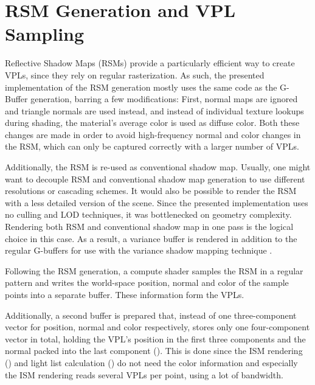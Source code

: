\section{RSM Generation and VPL Sampling}
\label{sec:impl:rsmAndVplSampling}

Reflective Shadow Maps (RSMs) provide a particularly efficient way to create VPLs, since they rely on regular rasterization. As such, the presented implementation of the RSM generation mostly uses the same code as the G-Buffer generation, barring a few modifications: First, normal maps are ignored and triangle normals are used instead, and instead of individual texture lookups during shading, the material's average color is used as diffuse color. Both these changes are made in order to avoid high-frequency normal and color changes in the RSM, which can only be captured correctly with a larger number of VPLs.

Additionally, the RSM is re-used as conventional shadow map. Usually, one might want to decouple RSM and conventional shadow map generation to use different resolutions or cascading schemes. It would also be possible to render the RSM with a less detailed version of the scene. Since the presented implementation uses no culling and LOD techniques, it was bottlenecked on geometry complexity. Rendering both RSM and conventional shadow map in one pass is the logical choice in this case. As a result, a variance buffer is rendered in addition to the regular G-buffers for use with the variance shadow mapping technique \citep{Donnelly:2006:VSM}.

Following the RSM generation, a compute shader samples the RSM in a regular pattern and writes the world-space position, normal and color of the sample points into a separate buffer. These information form the VPLs.

Additionally, a second buffer is prepared that, instead of one three-component vector for position, normal and color respectively, stores only one four-component vector in total, holding the VPL's position in the first three components and the normal packed into the last component (\citet{Cigolle:2014:NormalPacking}). This is done since the ISM rendering () and light list calculation () do not need the color information and especially the ISM rendering reads several VPLs per point, using a lot of bandwidth.


